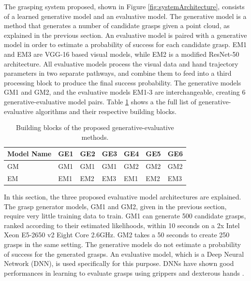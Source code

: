 The grasping system proposed, shown in Figure \ref{fig:systemArchitecture}, consists of a learned generative model and an evaluative model. The generative model is a method that generates a number of candidate grasps given a point cloud, as explained in the previous section. An evaluative model is paired with a generative model in order to estimate a probability of success for each candidate grasp. EM1 and EM3 are VGG-16 based visual models, while EM2 is a modified ResNet-50 architecture. All evaluative models process the visual data and hand trajectory parameters in two separate pathways, and combine them to feed into a third processing block to produce the final success probability. The generative models GM1 and GM2, and the evaluative models EM1-3 are interchangeable, creating 6 generative-evaluative model pairs. Table \ref{table:GEBreakdown} shows a the full list of generative-evaluative algorithms and their respective building blocks.

\begin{table}[]
\centering
\begin{tabular}{|l|l|l|l|l|l|l|}
\hline
Model Name & GE1 & GE2 & GE3 & GE4 & GE5 & GE6 \\ \hline
GM         & GM1 & GM1 & GM1 & GM2 & GM2 & GM2 \\ \hline
EM         & EM1 & EM2 & EM3 & EM1 & EM2 & EM3 \\ \hline
\end{tabular}
\caption{Building blocks of the proposed generative-evaluative methods.}
\label{table:GEBreakdown}
\end{table}

In this section, the three proposed evaluative model architectures are explained. The grasp generator models, GM1 and GM2, given in the previous section, require very little training data to train. GM1 can generate 500 candidate grasps, ranked according to their estimated likelihoods, within 10 seconds on a 2x Intel Xeon E5-2650 v2 Eight Core 2.6GHz. GM2 takes a 50 seconds to create 250 grasps in the same setting. The generative models do not estimate a probability of success for the generated grasps. An evaluative model, which is a Deep Neural Network (DNN), is used specifically for this purpose. DNNs have shown good performances in learning to evaluate grasps using grippers \cite{levine16,lenz2015deep} and dexterous hands \cite{varley2015generating,lu2017planning}.

